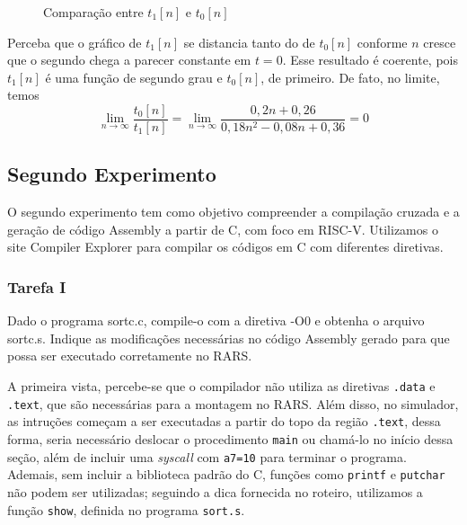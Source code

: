 \documentclass[a4paper,12pt]{article}
\newcommand{\cod}[1]{\texttt{#1}}
\begin{document}
\begin{figure}[H]
    \centering
    
    \vspace{-40pt}
    \caption{Comparação entre $t_1[n]$ e $t_0[n]$}
    \vspace{-10pt}
    \label{fig:placeholder}
\end{figure}

Perceba que o gráfico de $t_1[n]$ se distancia tanto do de $t_0[n]$ conforme $n$ cresce que o segundo chega a parecer constante em $t = 0$. Esse resultado é coerente, pois $t_1[n]$ é uma função de segundo grau e $t_0[n]$, de primeiro. De fato, no limite, temos
\[
\lim_{n\to\infty} \frac{t_0[n]}{t_1[n]} =\lim_{n\to\infty} \frac{0,2n + 0,26}{0,18 n^2 - 0,08n + 0,36} = 0
\]

\subsection{Segundo Experimento}
O segundo experimento tem como objetivo compreender a compilação cruzada e a geração de código Assembly a partir de C, com foco em RISC-V. Utilizamos o site Compiler Explorer para compilar os códigos em C com diferentes diretivas.

\subsubsection{Tarefa I}
\begin{tcolorbox}[title=Enunciado, colback=blue!5!white, colframe=blue!75!black]
Dado o programa sortc.c, compile-o com a diretiva -O0 e obtenha o arquivo sortc.s. Indique as modificações necessárias no código Assembly gerado para que possa ser executado corretamente no RARS.
\end{tcolorbox}

A primeira vista, percebe-se que o compilador não utiliza as diretivas \cod{.data} e \cod{.text}, que são necessárias para a montagem no RARS. Além disso, no simulador, as intruções começam a ser executadas a partir do topo da região \cod{.text}, dessa forma, seria necessário deslocar o procedimento \cod{main} ou chamá-lo no início dessa seção, além de incluir uma \textit{syscall} com \cod{a7=10} para terminar o programa. Ademais, sem incluir a biblioteca padrão do C, funções como \cod{printf} e \cod{putchar} não podem ser utilizadas; seguindo a dica fornecida no roteiro, utilizamos a função \cod{show}, definida no programa \cod{sort.s}.
\end{document}
